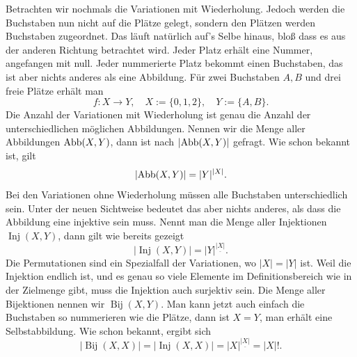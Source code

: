 Betrachten wir nochmals die Variationen mit Wiederholung. Jedoch werden
die Buchstaben nun nicht auf die Plätze gelegt, sondern den Plätzen
werden Buchstaben zugeordnet. Das läuft natürlich auf's Selbe hinaus,
bloß dass es aus der anderen Richtung betrachtet wird. Jeder Platz
erhält eine Nummer, angefangen mit null. Jeder nummerierte Platz
bekommt einen Buchstaben, das ist aber nichts anderes als eine
Abbildung. Für zwei Buchstaben $A,B$ und drei freie Plätze
erhält man
\[f\colon X\to Y,\quad X:=\{0,1,2\},\quad Y:=\{A,B\}.\]
Die Anzahl der Variationen mit Wiederholung ist genau die Anzahl
der unterschiedlichen möglichen Abbildungen. Nennen wir die Menge aller
Abbildungen $\operatorname{Abb}(X,Y)$, dann ist nach $|{\operatorname{Abb}(X,Y)}|$ gefragt.
Wie schon bekannt ist, gilt%
\[|{\operatorname{Abb}(X,Y)}| = |Y|^{|X|}.\]
Bei den Variationen ohne Wiederholung müssen alle Buchstaben
unterschiedlich sein. Unter der neuen Sichtweise bedeutet das aber
nichts anderes, als dass die Abbildung eine injektive sein muss.
Nennt man die Menge aller Injektionen $\operatorname{Inj}(X,Y)$,
dann gilt wie bereits gezeigt%
\[|{\operatorname{Inj}(X,Y)}| = |Y|^{\underline{|X|}}.\]
Die Permutationen sind ein Spezialfall der Variationen,
wo $|X|=|Y|$ ist. Weil die Injektion endlich ist, und es genau
so viele Elemente im Definitionsbereich wie in der Zielmenge gibt,
muss die Injektion auch surjektiv sein. Die Menge aller Bijektionen
nennen wir $\operatorname{Bij}(X,Y)$. Man kann jetzt auch einfach
die Buchstaben so nummerieren wie die Plätze, dann ist $X=Y$,
man erhält eine Selbstabbildung. Wie schon bekannt, ergibt sich%
\[|{\operatorname{Bij}(X,X)}| = |{\operatorname{Inj}(X,X)}|
= |X|^{\underline{|X|}} = |X|!.\]


